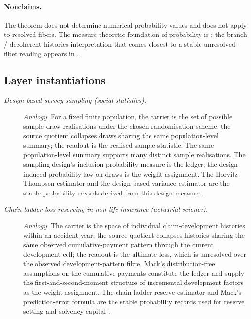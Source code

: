 \paragraph{Nonclaims.} The theorem does not determine numerical probability values and does
not apply to resolved fibers.  The measure-theoretic foundation of
probability is \citet{Kolmogorov1933Grundbegriffe}; the branch /
decoherent-histories interpretation that comes closest to a stable
unresolved-fiber reading appears in \citet{Griffiths1984ConsistentHistories}.

\subsection*{Layer instantiations}\label{layer-inst:F23}

\begingroup\small
\begin{description}
\item[\emph{Design-based survey sampling (social
statistics).}] \textit{Analogy.}
For a fixed finite population, the carrier is the set of
possible sample-draw realisations under the chosen
randomisation scheme; the source quotient collapses
draws sharing the same population-level summary; the
readout is the realised sample statistic.  The same
population-level summary supports many distinct sample
realisations.  The sampling design's inclusion-probability
measure is the ledger; the design-induced probability
law on draws is the weight assignment.  The
Horvitz-Thompson estimator and the design-based variance
estimator are the stable probability records derived
from this design measure
\citep{Cochran1977SamplingTechniques}.

\item[\emph{Chain-ladder loss-reserving in non-life
insurance (actuarial science).}] \textit{Analogy.}
The carrier is the space of individual
claim-development histories within an accident year;
the source quotient collapses histories sharing the
same observed cumulative-payment pattern through the
current development cell; the readout is the ultimate
loss, which is unresolved over the observed
development-pattern fibre.  Mack's distribution-free
assumptions on the cumulative payments constitute the
ledger and supply the first-and-second-moment structure
of incremental development factors as the weight
assignment.  The chain-ladder reserve estimator and
Mack's prediction-error formula are the stable
probability records used for reserve setting and
solvency capital \citep{Mack1993ChainLadder}.


\end{description}
